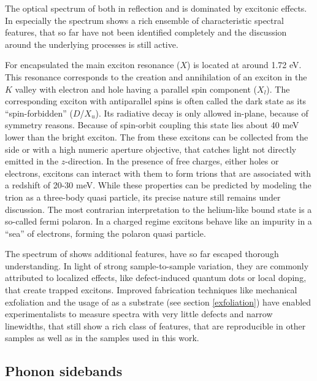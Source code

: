 The optical spectrum of \tmds both in reflection and \pl is dominated by excitonic effects. In \wse especially the \pl spectrum shows a rich ensemble of characteristic spectral features, that so far have not been identified completely and the discussion around the underlying processes is still active.

For \hbng encapsulated \wse the main exciton resonance ($X$) is located at around 1.72 eV. This resonance corresponds to the creation and annihilation of an exciton in the $K$ valley with electron and hole having a parallel spin component ($X_l$). The corresponding exciton with antiparallel spins is often called the dark state as its ``spin-forbidden'' ($D$/$X_u$). Its radiative decay is only allowed in-plane, because of symmetry reasons\texttrademark. Because of spin-orbit coupling this state lies about 40 meV lower than the bright exciton\cite{echeverry_splitting_2016}. The \pl from these excitons can be collected from the side or with a high numeric aperture objective, that catches light not directly emitted in the $z$-direction\cite{robert_fine_2017, wang_-plane_2017}. In the presence of free charges, either holes or electrons, excitons can interact with them to form trions that are associated with a redshift of 20-30 meV\cite{courtade_charged_2017}. While these properties can be predicted by modeling the trion as a three-body quasi particle, its precise nature still remains under discussion. The most contrarian interpretation to the helium-like bound state is a so-called fermi polaron. In a charged regime excitons behave like an impurity in a ``sea'' of electrons, forming the polaron quasi particle\cite{sidler_fermi_2016, efimkin_many-body_2017,schmidt_fermi_2012}.

The spectrum of \wse shows additional features, have so far escaped thorough understanding. In light of strong sample-to-sample variation, they are commonly attributed to localized effects, like defect-induced quantum dots or local doping\cite{kato_optical_2014, zhang_defect_2017}, that create trapped excitons. Improved fabrication techniques like mechanical exfoliation and the usage of \hbng as a substrate (see section \ref{exfoliation}) have enabled experimentalists to measure spectra with very little defects and narrow linewidths, that still show a rich class of features, that are reproducible in other samples as well as in the samples used in this work.

\subsection{Phonon sidebands}\label{sidebands}

